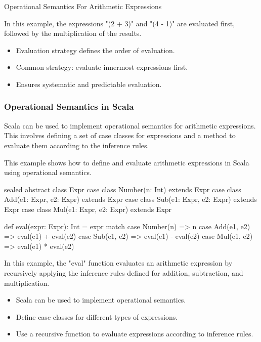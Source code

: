 \begin{notes}{Operational Semantics For Arithmetic Expressions}
\begin{highlight}
        In this example, the expressions "(2 + 3)" and "(4 - 1)" are evaluated first, followed by the multiplication of the results.
    
        \begin{itemize}
            \item Evaluation strategy defines the order of evaluation.
            \item Common strategy: evaluate innermost expressions first.
            \item Ensures systematic and predictable evaluation.
        \end{itemize}
    
    \end{highlight}
    
    \subsubsection*{Operational Semantics in Scala}
    
    Scala can be used to implement operational semantics for arithmetic expressions. This involves defining a set of case classes for expressions and a method to evaluate them according to the inference rules.
    
    \begin{highlight}
    
        This example shows how to define and evaluate arithmetic expressions in Scala using operational semantics.
    
    \begin{code}[Scala]
    sealed abstract class Expr
    case class Number(n: Int) extends Expr
    case class Add(e1: Expr, e2: Expr) extends Expr
    case class Sub(e1: Expr, e2: Expr) extends Expr
    case class Mul(e1: Expr, e2: Expr) extends Expr
    
    def eval(expr: Expr): Int = expr match {
        case Number(n) => n
        case Add(e1, e2) => eval(e1) + eval(e2)
        case Sub(e1, e2) => eval(e1) - eval(e2)
        case Mul(e1, e2) => eval(e1) * eval(e2)
    }
    \end{code}
    
        In this example, the "eval" function evaluates an arithmetic expression by recursively applying the inference rules defined for addition, subtraction, and multiplication.
    
        \begin{itemize}
            \item Scala can be used to implement operational semantics.
            \item Define case classes for different types of expressions.
            \item Use a recursive function to evaluate expressions according to inference rules.
        \end{itemize}
    

\end{highlight}
\end{notes}

